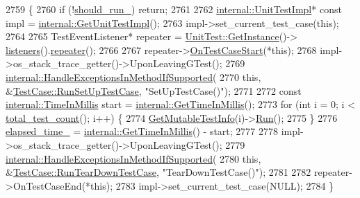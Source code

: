 \begin{DoxyCode}
2759                    \{
2760   \textcolor{keywordflow}{if} (!\hyperlink{classtesting_1_1TestCase_a2f98fefe1f624c879e0320882c561d85}{should\_run\_}) \textcolor{keywordflow}{return};
2761 
2762   \hyperlink{classtesting_1_1TestCase_acc0a5e7573fd6ae7ad1878613bb86853}{internal::UnitTestImpl}* \textcolor{keyword}{const} impl = 
      \hyperlink{namespacetesting_1_1internal_a9bd0caf5d16512de38b39599c13ee634}{internal::GetUnitTestImpl}();
2763   impl->set\_current\_test\_case(\textcolor{keyword}{this});
2764 
2765   TestEventListener* repeater = \hyperlink{classtesting_1_1UnitTest_a24192400b70b3b946746954e9574fb8e}{UnitTest::GetInstance}()->
      \hyperlink{classtesting_1_1UnitTest_aac10085cf7c0d1751306db10cdd953cb}{listeners}().\hyperlink{classtesting_1_1TestEventListeners_ad28af964081553de465fbfc1c5a46650}{repeater}();
2766 
2767   repeater->\hyperlink{classtesting_1_1TestEventListener_ab4ed885d63f5bbff8076c1329b3dfe36}{OnTestCaseStart}(*\textcolor{keyword}{this});
2768   impl->os\_stack\_trace\_getter()->UponLeavingGTest();
2769   \hyperlink{namespacetesting_1_1internal_addb2ed165b92b74e25fe9ebe9e46b9f9}{internal::HandleExceptionsInMethodIfSupported}(
2770       \textcolor{keyword}{this}, &\hyperlink{classtesting_1_1TestCase_a10763d318d617f921803741ec81919c5}{TestCase::RunSetUpTestCase}, \textcolor{stringliteral}{"SetUpTestCase()"});
2771 
2772   \textcolor{keyword}{const} \hyperlink{namespacetesting_1_1internal_a66a845df404b38fe85c5e14a069f255a}{internal::TimeInMillis} start = 
      \hyperlink{namespacetesting_1_1internal_ae66b46943a429e6efb1db456d4cae90c}{internal::GetTimeInMillis}();
2773   \textcolor{keywordflow}{for} (\textcolor{keywordtype}{int} i = 0; i < \hyperlink{classtesting_1_1TestCase_aba3cab19aaf7295284f0832f2cf895a3}{total\_test\_count}(); i++) \{
2774     \hyperlink{classtesting_1_1TestCase_aee03569f8ecb89cfe479e71f11edc3ea}{GetMutableTestInfo}(i)->\hyperlink{classtesting_1_1TestInfo_ade784915e9be3a01e3a6ef509b77d6c9}{Run}();
2775   \}
2776   \hyperlink{classtesting_1_1TestCase_a0379c376d8832e6fd1d5d9c7c3c32759}{elapsed\_time\_} = \hyperlink{namespacetesting_1_1internal_ae66b46943a429e6efb1db456d4cae90c}{internal::GetTimeInMillis}() - start;
2777 
2778   impl->os\_stack\_trace\_getter()->UponLeavingGTest();
2779   \hyperlink{namespacetesting_1_1internal_addb2ed165b92b74e25fe9ebe9e46b9f9}{internal::HandleExceptionsInMethodIfSupported}(
2780       \textcolor{keyword}{this}, &\hyperlink{classtesting_1_1TestCase_a23563c9cbbd004159c6acef2af0e7c39}{TestCase::RunTearDownTestCase}, \textcolor{stringliteral}{"TearDownTestCase()"});
2781 
2782   repeater->OnTestCaseEnd(*\textcolor{keyword}{this});
2783   impl->set\_current\_test\_case(NULL);
2784 \}
\end{DoxyCode}
